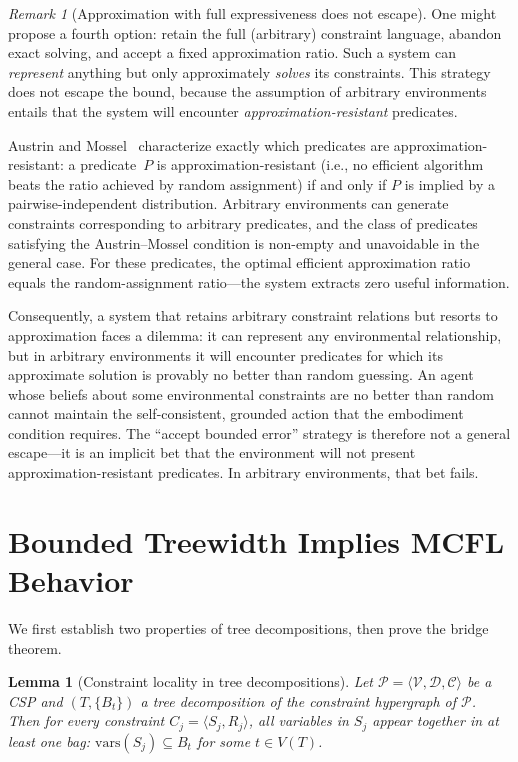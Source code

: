 \documentclass[11pt,a4paper]{article}
\theoremstyle{plain}
\newtheorem{lemma}[theorem]{Lemma}
\theoremstyle{definition}
\theoremstyle{remark}
\newtheorem{remark}[theorem]{Remark}
\begin{document}
\begin{remark}[Approximation with full expressiveness does not escape]\label{rem:approx-full-escape}
One might propose a fourth option: retain the full (arbitrary) constraint language, abandon exact solving, and accept a fixed approximation ratio.
Such a system can \emph{represent} anything but only approximately \emph{solves} its constraints.
This strategy does not escape the bound, because the assumption of arbitrary environments entails that the system will encounter \emph{approximation-resistant} predicates.

Austrin and Mossel~\cite{AustrinMossel09} characterize exactly which predicates are approximation-resistant: a predicate~$P$ is approximation-resistant (i.e., no efficient algorithm beats the ratio achieved by random assignment) if and only if $P$ is implied by a pairwise-independent distribution.
Arbitrary environments can generate constraints corresponding to arbitrary predicates, and the class of predicates satisfying the Austrin--Mossel condition is non-empty and unavoidable in the general case.
For these predicates, the optimal efficient approximation ratio equals the random-assignment ratio---the system extracts zero useful information.

Consequently, a system that retains arbitrary constraint relations but resorts to approximation faces a dilemma: it can represent any environmental relationship, but in arbitrary environments it will encounter predicates for which its approximate solution is provably no better than random guessing.
An agent whose beliefs about some environmental constraints are no better than random cannot maintain the self-consistent, grounded action that the embodiment condition requires.
The ``accept bounded error'' strategy is therefore not a general escape---it is an implicit bet that the environment will not present approximation-resistant predicates.
In arbitrary environments, that bet fails.
\end{remark}

\section{Bounded Treewidth Implies MCFL Behavior}\label{sec:bridge}

We first establish two properties of tree decompositions, then prove the bridge theorem.

\begin{lemma}[Constraint locality in tree decompositions]\label{lem:locality}
Let $\mathcal{P} = \langle \mathcal{V}, \mathcal{D}, \mathcal{C} \rangle$ be a CSP and $(T, \{B_t\})$ a tree decomposition of the constraint hypergraph of $\mathcal{P}$.
Then for every constraint $C_j = \langle S_j, R_j \rangle$, all variables in $S_j$ appear together in at least one bag: $\mathrm{vars}(S_j) \subseteq B_t$ for some $t \in V(T)$.
\end{lemma}
\end{document}
